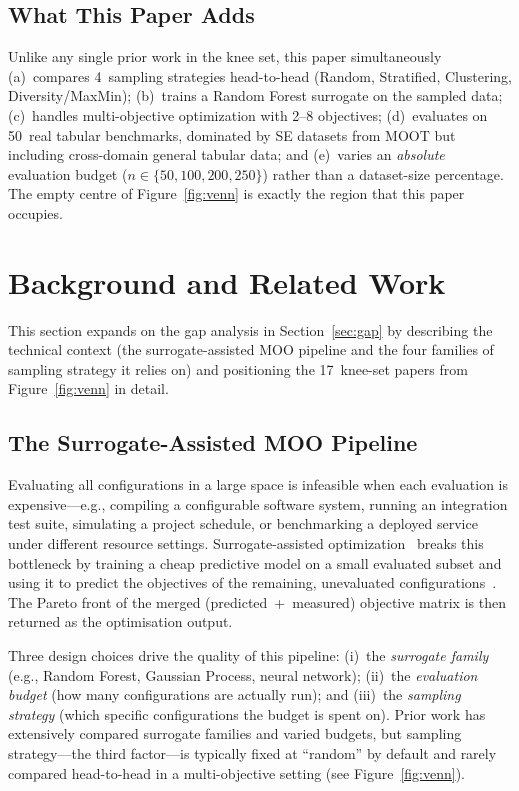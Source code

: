 \documentclass[sigconf,nonacm]{acmart}
\begin{document}
\subsection{What This Paper Adds}

Unlike any single prior work in the knee set, this paper simultaneously
(a)~compares 4~sampling strategies head-to-head (Random, Stratified,
Clustering, Diversity/MaxMin);
(b)~trains a Random Forest surrogate on the sampled data;
(c)~handles multi-objective optimization with 2--8 objectives;
(d)~evaluates on 50~real tabular benchmarks, dominated by SE datasets from
MOOT but including cross-domain general tabular data;
and (e)~varies an \emph{absolute} evaluation budget ($n\in\{50,100,200,250\}$)
rather than a dataset-size percentage.
The empty centre of Figure~\ref{fig:venn} is exactly the region that this
paper occupies.

\section{Background and Related Work}
\label{sec:background}

This section expands on the gap analysis in Section~\ref{sec:gap} by
describing the technical context (the surrogate-assisted MOO pipeline and
the four families of sampling strategy it relies on) and positioning the
17~knee-set papers from Figure~\ref{fig:venn} in detail.

\subsection{The Surrogate-Assisted MOO Pipeline}

Evaluating all configurations in a large space is infeasible when each
evaluation is expensive---e.g., compiling a configurable software system,
running an integration test suite, simulating a project schedule, or
benchmarking a deployed service under different resource settings.
Surrogate-assisted optimization~\cite{wang2020adaptive} breaks this bottleneck
by training a cheap predictive model on a small evaluated subset and using it
to predict the objectives of the remaining, unevaluated
configurations~\cite{nair2018finding}.
The Pareto front of the merged (predicted~+~measured) objective matrix is
then returned as the optimisation output.

Three design choices drive the quality of this pipeline:
(i)~the \emph{surrogate family} (e.g., Random Forest, Gaussian Process,
neural network);
(ii)~the \emph{evaluation budget} (how many configurations are actually
run); and
(iii)~the \emph{sampling strategy} (which specific configurations the budget
is spent on).
Prior work has extensively compared surrogate families and varied budgets,
but sampling strategy---the third factor---is typically fixed at ``random'' by
default and rarely compared head-to-head in a multi-objective setting
(see Figure~\ref{fig:venn}).
\end{document}
